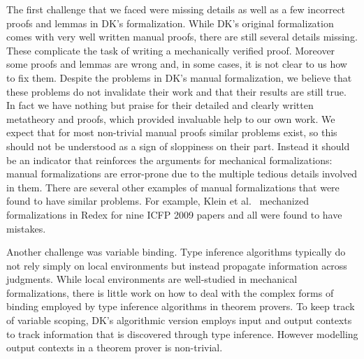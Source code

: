The first challenge that we faced were missing details as well as
a few incorrect proofs and lemmas in DK's formalization. While DK's
original formalization comes with very well written manual proofs,
there are still several details missing. These complicate the task of
writing a mechanically verified proof. Moreover some proofs and
lemmas are wrong and, in some cases, it is not clear to us how to fix them.
Despite the problems in DK's manual formalization,
we believe that these problems do not
invalidate their work and that their results are still true. In fact we have nothing but praise for their detailed
and clearly written metatheory and proofs, which provided invaluable
help to our own work.
We expect that for most non-trivial manual
proofs similar problems exist, so this should not be understood as a sign of sloppiness
on their part. Instead it should be an indicator that reinforces the arguments
for mechanical formalizations: manual formalizations are error-prone due to the multiple
tedious details involved in them.
There are several other examples of manual formalizations that were found to have
similar problems. For example, Klein et al.~\cite{KleinRunYourResearch}
mechanized formalizations
in Redex for nine ICFP 2009 papers and all were found to have mistakes.

Another challenge was variable binding. Type inference algorithms
typically do not rely simply on local environments but instead
propagate information across judgments. While local environments are
well-studied in mechanical formalizations, there is little work on how
to deal with the complex forms of binding employed by type inference algorithms
in theorem provers. To
keep track of variable scoping, DK's algorithmic version employs input
and output contexts to track information that is discovered through
type inference. However modelling output contexts in a theorem prover
is non-trivial.

